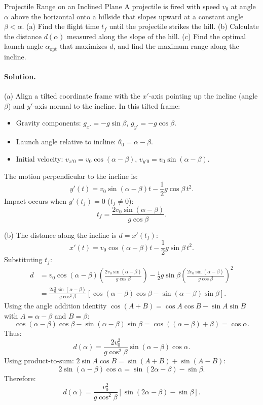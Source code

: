 \begin{workedexample}{Projectile Range on an Inclined Plane}
A projectile is fired with speed $v_0$ at angle $\alpha$ above the horizontal onto a hillside that slopes upward at a constant angle $\beta < \alpha$.
(a) Find the flight time $t_f$ until the projectile strikes the hill.
(b) Calculate the distance $d(\alpha)$ measured along the slope of the hill.
(c) Find the optimal launch angle $\alpha_{\text{opt}}$ that maximizes $d$, and find the maximum range along the incline.

\paragraph{Solution.}

(a) Align a tilted coordinate frame with the $x'$-axis pointing up the incline (angle $\beta$) and $y'$-axis normal to the incline.
In this tilted frame:
\begin{itemize}[leftmargin=1.4em,itemsep=2pt]
  \item Gravity components: $g_{x'} = -g\sin\beta$, $g_{y'} = -g\cos\beta$.
  \item Launch angle relative to incline: $\theta_0 = \alpha - \beta$.
  \item Initial velocity: $v_{x'0} = v_0\cos(\alpha - \beta)$, $v_{y'0} = v_0\sin(\alpha - \beta)$.
\end{itemize}
The motion perpendicular to the incline is:
\[
y'(t) = v_0\sin(\alpha - \beta)t - \frac{1}{2}g\cos\beta\,t^2.
\]
Impact occurs when $y'(t_f) = 0$ ($t_f \ne 0$):
\[
\boxed{t_f = \frac{2v_0\sin(\alpha - \beta)}{g\cos\beta}.}
\]

(b) The distance along the incline is $d = x'(t_f)$:
\[
x'(t) = v_0\cos(\alpha - \beta)t - \frac{1}{2}g\sin\beta\,t^2.
\]
Substituting $t_f$:
\begin{align*}
d &= v_0\cos(\alpha - \beta)\left(\frac{2v_0\sin(\alpha - \beta)}{g\cos\beta}\right) - \frac{1}{2}g\sin\beta\left(\frac{2v_0\sin(\alpha - \beta)}{g\cos\beta}\right)^2 \\
&= \frac{2v_0^2\sin(\alpha - \beta)}{g\cos^2\beta}\left[ \cos(\alpha - \beta)\cos\beta - \sin(\alpha - \beta)\sin\beta \right].
\end{align*}
Using the angle addition identity $\cos(A+B) = \cos A\cos B - \sin A\sin B$ with $A = \alpha - \beta$ and $B = \beta$:
\[
\cos(\alpha - \beta)\cos\beta - \sin(\alpha - \beta)\sin\beta = \cos((\alpha - \beta) + \beta) = \cos\alpha.
\]
Thus:
\[
\boxed{d(\alpha) = \frac{2v_0^2}{g\cos^2\beta}\sin(\alpha - \beta)\cos\alpha.}
\]
Using product-to-sum: $2\sin A\cos B = \sin(A+B) + \sin(A-B)$:
\[
2\sin(\alpha - \beta)\cos\alpha = \sin(2\alpha - \beta) - \sin\beta.
\]
Therefore:
\[
\boxed{d(\alpha) = \frac{v_0^2}{g\cos^2\beta}\left[ \sin(2\alpha - \beta) - \sin\beta \right].}
\]


\end{workedexample}
